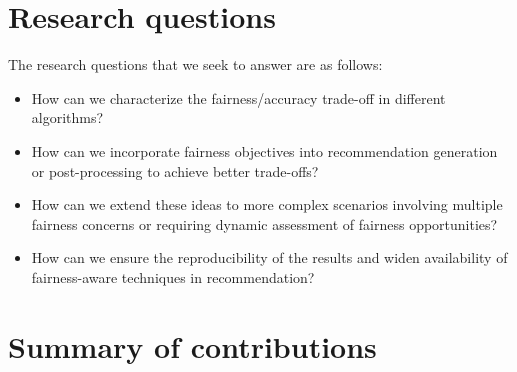 \section{Research questions}

The research questions that we seek to answer are as follows:

\begin{itemize}
    \item How can we characterize the fairness/accuracy trade-off in different algorithms?
    \item How can we incorporate fairness objectives into recommendation generation or post-processing to achieve better trade-offs? %
    \item How can we extend these ideas to more complex scenarios involving multiple fairness concerns or requiring dynamic assessment of fairness opportunities? %
    \item How can we ensure the reproducibility of the results and widen availability of fairness-aware techniques in recommendation? %
\end{itemize}

\section{Summary of contributions}









